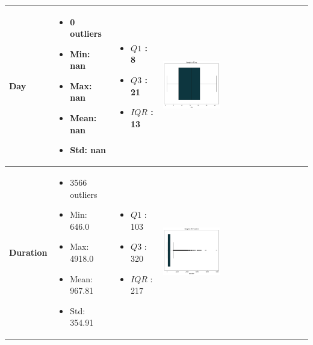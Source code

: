 \documentclass{article}
\begin{document}
\begin{longtable}{|p{}|p{}|p{}|p{}|}
            \hline
            \textbf{Day} & 
            \begin{itemize}
                \item 0 outliers
                \item Min: nan
                \item Max: nan
                \item Mean: nan
                \item Std: nan
            \end{itemize} & 
            \begin{itemize}
                \item $Q1$ : 8
                \item $Q3$ : 21
                \item $IQR$ : 13
            \end{itemize} &
            \includegraphics[width=0.40\textwidth]{data/bank_marketing/pic/Outlier/Day.png} \\
            \hline
            \textbf{Duration} & 
            \begin{itemize}
                \item 3566 outliers
                \item Min: 646.0
                \item Max: 4918.0
                \item Mean: 967.81
                \item Std: 354.91
            \end{itemize} & 
            \begin{itemize}
                \item $Q1$ : 103
                \item $Q3$ : 320
                \item $IQR$ : 217
            \end{itemize} &
            \includegraphics[width=0.40\textwidth]{data/bank_marketing/pic/Outlier/Duration.png} \\

\end{longtable}
\end{document}
